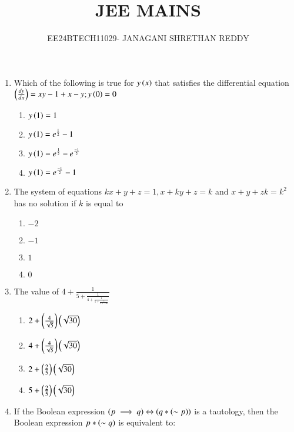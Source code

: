 \documentclass[journal,12pt,twocolumn]{IEEEtran}
\theoremstyle{remark}
\begin{document}
 


\vspace{3cm}

\title{JEE MAINS}
\author{EE24BTECH11029- JANAGANI SHRETHAN REDDY}
\maketitle{}
\newpage
\bigskip
\renewcommand{\thefigure}{\theenumi}
\renewcommand{\thetable}{\theenum}
\begin{enumerate}
    \item Which of the following is true for $y\left(x\right)$ that satisfies the differential equation $\left(\frac{dy}{dx}\right)=xy-1+x-y;y\left(0\right)=0$
    \begin{enumerate}
        \item $y\left(1\right)=1$
        \item $y\left(1\right)=e^{\frac{1}{2}}-1$
        \item $y\left(1\right)=e^{\frac{1}{2}}-e^{\frac{-1}{2}}$
        \item $y\left(1\right)=e^{\frac{-1}{2}}-1$\\
    \end{enumerate}
    \item The system of equations $kx+y+z=1, x+ky+z=k$ and $x+y+zk=k^2$ has no solution if $k$ is equal to
    \begin{enumerate}
        \item $-2$
        \item $-1$
        \item $1$
        \item $0$\\
    \end{enumerate}
    \item The value of $4+\frac{1}{5+\frac{1}{4+\frac{1}{5+\frac{1}{4+\dots\infty}}}}$
    \begin{enumerate}
        \item $2+\left(\frac{4}{\sqrt{5}}\right)\left(\sqrt{30}\right)$
        \item $4+\left(\frac{4}{\sqrt{5}}\right)\left(\sqrt{30}\right)$
        \item $2+\left(\frac{2}{5}\right)\left(\sqrt{30}\right)$
        \item $5+\left(\frac{2}{5}\right)\left(\sqrt{30}\right)$\\
    \end{enumerate}
    \item If the Boolean expression $\left(p\implies q\right)\Leftrightarrow\left(q*\left(\sim p\right)\right)$  is a tautology, then the Boolean expression $p*\left(\sim q\right)$ is equivalent to:

\end{enumerate}
\end{document}
